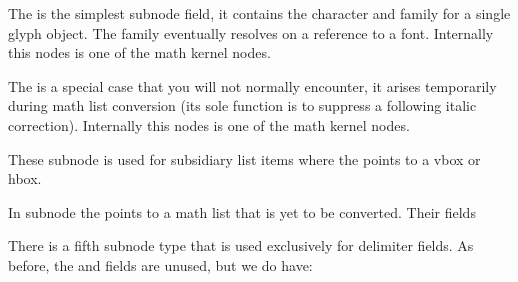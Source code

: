 
\stopsubsection

\startsubsection[title=mathchar]

The  is the simplest subnode field, it contains the character and
family for a single glyph object. The family eventually resolves on a reference
to a font. Internally this nodes is one of the math kernel nodes.



\stopsubsection

\startsubsection[title=mathtextchar]

The  is a special case that you will not normally encounter,
it arises temporarily during math list conversion (its sole function is to
suppress a following italic correction). Internally this nodes is one of the math
kernel nodes.



\stopsubsection

\startsubsection[title=subbox]

These  subnode is used for subsidiary list items where
the  points to a  vbox or hbox.



\stopsubsection

\startsubsection[title=submlist]

In  subnode the  points to a math list that is yet to
be converted. Their fields



\stopsubsection

\startsubsection[title={delimiter}]

There is a fifth subnode type that is used exclusively for delimiter fields. As
before, the  and  fields are unused, but we do have:

